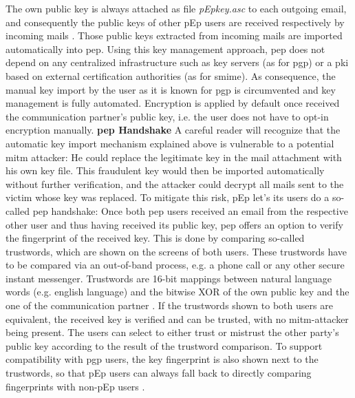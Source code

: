 The own public key is always attached as file \emph{pEpkey.asc} to each outgoing email, and consequently the public keys of other pEp users are received respectively by incoming mails \cite{pep-email-format-protocols}. Those public keys extracted from incoming mails are imported automatically into \acrshort{pep}. Using this key management approach, \acrshort{pep} does not depend on any centralized infrastructure such as key servers (as for \acrshort{pgp}) or a \acrshort{pki} based on external certification authorities (as for \acrshort{smime}). As consequence, the manual key import by the user as it is known for \acrshort{pgp} is circumvented and key management is fully automated. Encryption is applied by default once received the communication partner's public key, i.e. the user does not have to opt-in encryption manually.
\newline
\newline
\textbf{\acrshort{pep} Handshake}\newline
A careful reader will recognize that the automatic key import mechanism explained above is vulnerable to a potential \acrfull{mitm} attacker: He could replace the legitimate key in the mail attachment with his own key file. This fraudulent key would then be imported automatically without further verification, and the attacker could decrypt all mails sent to the victim whose key was replaced.
\newline
To mitigate this risk, pEp let's its users do a so-called \acrshort{pep} handshake: Once both \acrshort{pep} users received an email from the respective other user and thus having received its public key, \acrshort{pep} offers an option to verify the fingerprint of the received key. This is done by comparing so-called trustwords, which are shown on the screens of both users. These trustwords have to be compared via an out-of-band process, e.g. a phone call or any other secure instant messenger. Trustwords are 16-bit mappings between natural language words (e.g. english language) and the bitwise XOR of the own public key and the one of the communication partner \cite{pep-trustwords}. If the trustwords shown to both users are equivalent, the received key is verified and can be trusted, with no \acrshort{mitm}-attacker being present. The users can select to either trust or mistrust the other party's public key according to the result of the trustword
comparison. To support compatibility with \acrshort{pgp} users, the key fingerprint is also shown next to the trustwords, so that pEp users can always fall back to directly comparing fingerprints with non-pEp users \cite{pep-handshake}.

